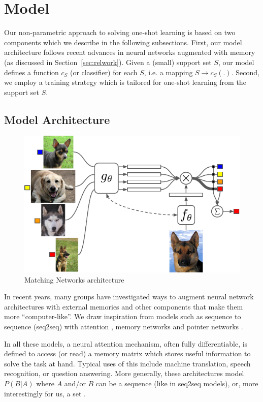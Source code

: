 \vspace{-0.09in}
\section{Model}
\label{sec:model}

Our non-parametric approach to solving one-shot learning is based on two components which we describe in the following subsections. First, our model architecture follows recent advances in neural networks augmented with memory (as discussed in Section~\ref{sec:relwork}). Given a (small) support set $S$, our model defines a function $c_S$ (or classifier) for each $S$, i.e. a mapping $S \rightarrow c_S(.)$. Second, we employ a training strategy which is tailored for one-shot learning from the support set $S$.

\vspace{-0.09in}
\subsection{Model Architecture}

\begin{figure}[t]
\centering
\includegraphics[width=.8\textwidth]{fig1}
\caption{\label{fig:arch}Matching Networks architecture}
\end{figure}

In recent years, many groups have investigated ways to augment neural network architectures with external memories and other components that make them more ``computer-like''. We draw inspiration from models such as sequence to sequence (seq2seq) with attention \cite{montreal}, memory networks \cite{memnets} and pointer networks \cite{ptrnets}.

In all these models, a neural attention mechanism, often fully differentiable, is defined to access (or read) a memory matrix which stores useful information to solve the task at hand. Typical uses of this include machine translation, speech recognition, or question answering. More generally, these architectures model $P(B|A)$ where $A$ and/or $B$ can be a sequence (like in seq2seq models), or, more interestingly for us, a set \cite{vinyals2015order}.

